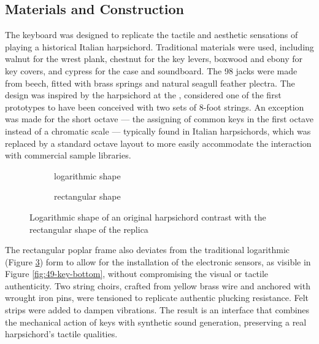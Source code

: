 \subsection{Materials and Construction}
The keyboard was designed to replicate the tactile and aesthetic sensations of playing a historical Italian harpsichord. Traditional materials were used, including walnut for the wrest plank, chestnut for the key levers, boxwood and ebony for key covers, and cypress for the case and soundboard. The 98 jacks were made from beech, fitted with brass springs and natural seagull feather plectra. The design was inspired by the  harpsichord at the , considered one of the first prototypes to have been conceived with two sets of 8-foot strings. An exception was made for the short octave --- the assigning of common keys in the first octave instead of a chromatic scale --- typically found in Italian harpsichords, which was replaced by a standard octave layout to more easily accommodate the interaction with commercial sample libraries. 

\begin{figure}[!b]
    \centering
     \begin{subfigure}[h]{0.4\linewidth}
        \centering
                    
        \caption{logarithmic shape}    
        \label{fig:log-harp}
    \end{subfigure}

    
    \begin{subfigure}[h]{0.4\linewidth}
        \centering
                
        \caption{rectangular shape}
        \label{fig:rect-harp}
    \end{subfigure}
    \caption{Logarithmic shape of an original  harpsichord contrast with the rectangular shape of the replica}    
    \Description{}
    \label{fig:log-harp-comp}
\end{figure}

The rectangular poplar frame also deviates from the traditional logarithmic (Figure \ref{fig:log-harp-comp}) form to allow for the installation of the electronic sensors, as visible in Figure \ref{fig:49-key-bottom}, without compromising the visual or tactile authenticity. Two string choirs, crafted from yellow brass wire and anchored with wrought iron pins, were tensioned to replicate authentic plucking resistance. Felt strips were added to dampen vibrations. The result is an interface that combines the mechanical action of keys with synthetic sound generation, preserving a real harpsichord's tactile qualities.

